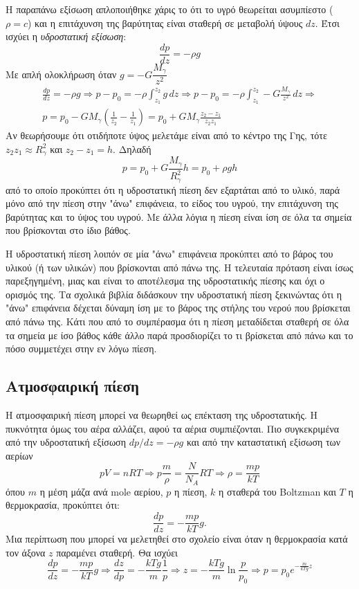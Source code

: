 \documentclass[12pt]{article}
\begin{document}
Η παραπάνω εξίσωση απλοποιήθηκε χάρις το ότι το υγρό θεωρείται ασυμπίεστο ($ρ=c$) και η επιτάχυνση της βαρύτητας είναι σταθερή σε μεταβολή ύψους $dz$. Έτσι ισχύει η \textit{υδροστατική εξίσωση}:
\begin{equation} \label{eq:13}
  \frac{dp}{dz}=-ρg
\end{equation}
Με απλή ολοκλήρωση όταν $g=-G\dfrac{M_γ}{z^2}$
\begin{gather*}
  \frac{dp}{dz}=-ρg \Rightarrow p-p_0=-ρ\int_{z_1}^{z_2} g\, dz \Rightarrow p-p_0=-ρ\int_{z_1}^{z_2} -G\frac{M_γ}{z^2}\, dz \Rightarrow \\
  p=p_0-GM_γ\left(\frac{1}{z_2}-\frac{1}{z_1}\right)=p_0+GM_γ\frac{z_2-z_1}{z_2z_1}
\end{gather*}
Αν θεωρήσουμε ότι οτιδήποτε ύψος μελετάμε είναι από το κέντρο της Γης, τότε $z_2z_1\approx R_γ^2$ και $z_2-z_1=h$. Δηλαδή
\begin{equation} \label{eq:17}
  p=p_0+G\frac{M_γ}{R_γ^2}h=p_0+ρgh
\end{equation}
από το οποίο προκύπτει ότι η υδροστατική πίεση δεν εξαρτάται από το υλικό, παρά μόνο από την πίεση στην "άνω" επιφάνεια, το είδος του υγρού, την επιτάχυνση της βαρύτητας και το ύψος του υγρού. Με άλλα λόγια η πίεση είναι ίση σε όλα τα σημεία που βρίσκονται στο ίδιο βάθος.

Η υδροστατική πίεση λοιπόν σε μία "άνω" επιφάνεια προκύπτει από το βάρος του υλικού (ή των υλικών) που βρίσκονται από πάνω της. Η τελευταία πρόταση είναι ίσως παρεξηγημένη, μιας και είναι το αποτέλεσμα της υδροστατικής πίεσης και όχι ο ορισμός της. Τα σχολικά βιβλία διδάσκουν την υδροστατική πίεση ξεκινώντας ότι η "άνω" επιφάνεια δέχεται δύναμη ίση με το βάρος της στήλης του νερού που βρίσκεται από πάνω της. Κάτι που από το συμπέρασμα ότι η πίεση μεταδίδεται σταθερή σε όλα τα σημεία με ίσο βάθος κάθε άλλο παρά προσδιορίζει το τι βρίσκεται από πάνω και το πόσο συμμετέχει στην εν λόγω πίεση.
\subsection{Ατμοσφαιρική πίεση}
Η ατμοσφαιρική πίεση μπορεί να θεωρηθεί ως επέκταση της υδροστατικής. Η πυκνότητα όμως του αέρα αλλάζει, αφού τα αέρια συμπιέζονται. Πιο συγκεκριμένα από την υδροστατική εξίσωση $dp/dz=-ρg$ και από την καταστατική εξίσωση των αερίων
$$pV=nRT \Rightarrow p\frac{m}{ρ}=\frac{N}{N_A}RT \Rightarrow ρ=\frac{mp}{kT}$$
όπου $m$ η μέση μάζα ανά mole αερίου, $p$ η πίεση, $k$ η σταθερά του Boltzman και $T$ η θερμοκρασία, προκύπτει ότι:
\begin{equation*}
  \frac{dp}{dz}=-\frac{mp}{kT}g.
\end{equation*}
Μια περίπτωση που μπορεί να μελετηθεί στο σχολείο είναι όταν η θερμοκρασία κατά τον άξονα $z$ παραμένει σταθερή. Θα ισχύει
\begin{equation} \label{eq:16}
  \frac{dp}{dz}=-\frac{mp}{kT}g \Rightarrow \frac{dz}{dp}=-\frac{kTg}{m}\frac{1}{p} \Rightarrow z=-\frac{kTg}{m}\ln \frac{p}{p_0} \Rightarrow p=p_0e^{-\frac{m}{kTg}z}
\end{equation}
\end{document}
